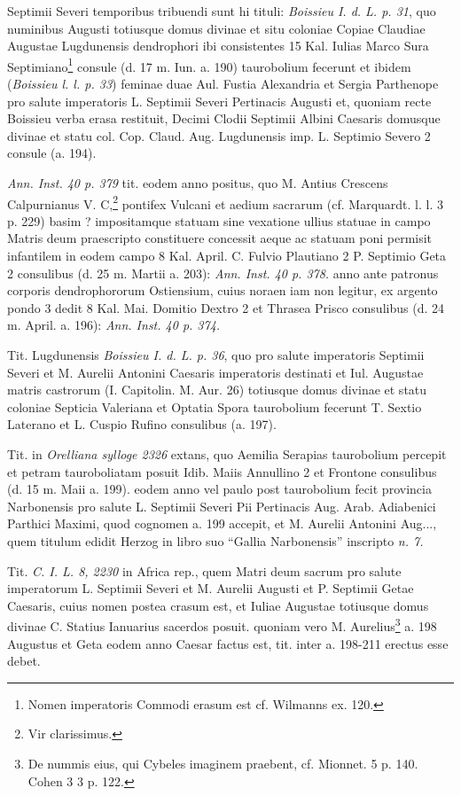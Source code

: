 \documentclass[a4paper, 11pt, oneside, polutonikogreek, german, twocolumn]{article}
\begin{document}
Septimii Severi temporibus tribuendi sunt hi tituli: \emph{Boissieu I. d. L. p. 31}, quo numinibus Augusti totiusque domus divinae et situ coloniae Copiae Claudiae Augustae Lugdunensis dendrophori ibi consistentes 15 Kal. Iulias Marco Sura Septimiano\footnote{Nomen imperatoris Commodi erasum est cf. Wilmanns ex. 120.} consule (d. 17 m. Iun. a. 190) taurobolium fecerunt et ibidem (\emph{Boissieu l. l. p. 33}) feminae duae Aul. Fustia Alexandria et Sergia Parthenope pro salute imperatoris L. Septimii Severi Pertinacis Augusti et, quoniam recte Boissieu verba erasa restituit, Decimi Clodii Septimii Albini Caesaris domusque divinae et statu col. Cop. Claud. Aug. Lugdunensis imp. L. Septimio Severo 2 consule (a. 194).

\emph{Ann. Inst. 40 p. 379} tit. eodem anno positus, quo M. Antius Crescens Calpurnianus V. C,\footnote{Vir clarissimus.} pontifex Vulcani et aedium sacrarum (cf. Marquardt. l. l. 3 p. 229) basim ? impositamque statuam sine vexatione ullius statuae in campo Matris deum praescripto constituere concessit aeque ac statuam poni permisit infantilem in eodem campo 8 Kal. April. C. Fulvio Plautiano 2 P. Septimio Geta 2 consulibus (d. 25 m. Martii a. 203): \emph{Ann. Inst. 40 p. 378.} anno ante patronus corporis dendrophororum Ostiensium, cuius noraen iam non legitur, ex argento pondo 3 dedit 8 Kal. Mai. Domitio Dextro 2 et Thrasea Prisco consulibus (d. 24 m. April. a. 196): \emph{Ann. Inst. 40 p. 374.}

Tit. Lugdunensis \emph{Boissieu I. d. L. p. 36}, quo pro salute imperatoris Septimii Severi et M. Aurelii Antonini Caesaris imperatoris destinati et Iul. Augustae matris castrorum (I. Capitolin. M. Aur. 26) totiusque domus divinae et statu coloniae Septicia Valeriana et Optatia Spora taurobolium fecerunt T. Sextio Laterano et L. Cuspio Rufino consulibus (a. 197).

Tit. in \emph{Orelliana sylloge 2326} extans, quo Aemilia Serapias taurobolium percepit et petram tauroboliatam posuit Idib. Maiis Annullino 2 et Frontone consulibus (d. 15 m. Maii a. 199). eodem anno vel paulo post taurobolium fecit provincia Narbonensis pro salute L. Septimii Severi Pii Pertinacis Aug. Arab. Adiabenici Parthici Maximi, quod cognomen a. 199 accepit, et M. Aurelii Antonini Aug..., quem titulum edidit Herzog in libro suo "`Gallia Narbonensis"' inscripto \emph{n. 7.}

Tit. \emph{C. I. L. 8, 2230} in Africa rep., quem Matri deum sacrum pro salute imperatorum L. Septimii Severi et M. Aurelii Augusti et P. Septimii Getae Caesaris, cuius nomen postea crasum est, et Iuliae Augustae totiusque domus divinae C. Statius Ianuarius sacerdos posuit. quoniam vero M. Aurelius\footnote{De nummis eius, qui Cybeles imaginem praebent, cf. Mionnet. 5 p. 140. Cohen 3 3 p. 122.} a. 198 Augustus et Geta eodem anno Caesar factus est, tit. inter a. 198-211 erectus esse debet.
\end{document}
